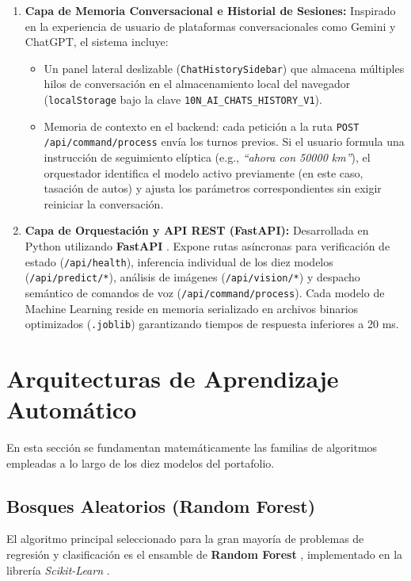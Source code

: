 \documentclass[12pt,letterpaper]{article}
\begin{document}
\begin{enumerate}[leftmargin=*]
    \item \textbf{Capa de Memoria Conversacional e Historial de Sesiones:}
    Inspirado en la experiencia de usuario de plataformas conversacionales como Gemini y ChatGPT, el sistema incluye:
    \begin{itemize}
        \item Un panel lateral deslizable (\texttt{ChatHistorySidebar}) que almacena múltiples hilos de conversación en el almacenamiento local del navegador (\texttt{localStorage} bajo la clave \texttt{10N\_AI\_CHATS\_HISTORY\_V1}).
        \item Memoria de contexto en el backend: cada petición a la ruta \texttt{POST /api/command/process} envía los turnos previos. Si el usuario formula una instrucción de seguimiento elíptica (e.g., \textit{``ahora con 50000 km''}), el orquestador identifica el modelo activo previamente (en este caso, tasación de autos) y ajusta los parámetros correspondientes sin exigir reiniciar la conversación.
    \end{itemize}

    \item \textbf{Capa de Orquestación y API REST (FastAPI):}
    Desarrollada en Python utilizando \textbf{FastAPI} \cite{tiangolo2018fastapi}. Expone rutas asíncronas para verificación de estado (\texttt{/api/health}), inferencia individual de los diez modelos (\texttt{/api/predict/*}), análisis de imágenes (\texttt{/api/vision/*}) y despacho semántico de comandos de voz (\texttt{/api/command/process}). Cada modelo de Machine Learning reside en memoria serializado en archivos binarios optimizados (\texttt{.joblib}) garantizando tiempos de respuesta inferiores a 20 ms.
\end{enumerate}

\section{Arquitecturas de Aprendizaje Automático}

En esta sección se fundamentan matemáticamente las familias de algoritmos empleadas a lo largo de los diez modelos del portafolio.

\subsection{Bosques Aleatorios (Random Forest)}
El algoritmo principal seleccionado para la gran mayoría de problemas de regresión y clasificación es el ensamble de \textbf{Random Forest} \cite{breiman2001random}, implementado en la librería \textit{Scikit-Learn} \cite{pedregosa2011scikit}.
\end{document}
